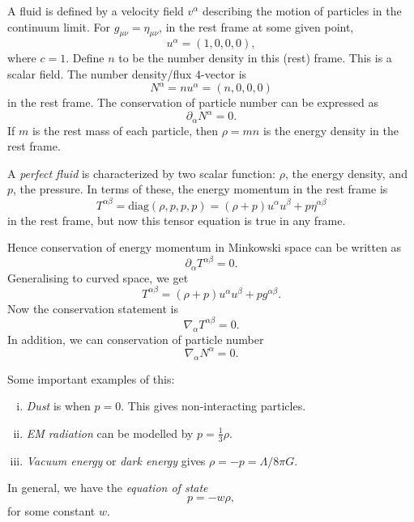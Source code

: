\documentclass[12pt]{article}
\begin{document}
\begin{exbox}
	A fluid is defined by a velocity field $v^\alpha$ describing the motion of particles in the continuum limit. For $g_{\mu\nu} = \eta_{\mu\nu}$, in the rest frame at some given point,
	\[
	u^\alpha = (1, 0, 0, 0),
	\]
	where $c = 1$. Define $n$ to be the number density in this (rest) frame. This is a scalar field. The number density/flux $4$-vector is
	\[
	N^\alpha = nu^\alpha = (n, 0, 0, 0)
	\]
	in the rest frame. The conservation of particle number can be expressed as
	\[
	\partial_\alpha N^\alpha = 0.
	\]
	If $m$ is the rest mass of each particle, then $\rho = mn$ is the energy density in the rest frame.

	A \emph{perfect fluid} is characterized by two scalar function: $\rho$, the energy density, and $p$, the pressure. In terms of these, the energy momentum in the rest frame is
	\[
	T^{\alpha\beta} = \mathrm{diag}(\rho, p, p, p) = (\rho + p)u^\alpha u^\beta + p \eta^{\alpha\beta}
	\]
	in the rest frame, but now this tensor equation is true in any frame.

	Hence conservation of energy momentum in Minkowski space can be written as
	\[
	\partial_\alpha T^{\alpha\beta} = 0.
	\]
	Generalising to curved space, we get
	\[
	T^{\alpha\beta} = (\rho + p)u^{\alpha} u^\beta + p g^{\alpha\beta}.
	\]
	Now the conservation statement is
	\[
	\nabla_\alpha T^{\alpha\beta} = 0.
	\]
	In addition, we can conservation of particle number
	\[
	\nabla_\alpha N^\alpha = 0.
	\]
\end{exbox}

Some important examples of this:
\begin{enumerate}[(i)]
	\item \emph{Dust} is when $p = 0$. This gives non-interacting particles.
	\item \emph{EM radiation} can be modelled by $p = \frac{1}{3} \rho$.
	\item \emph{Vacuum energy} or \emph{dark energy} gives $\rho = -p = \Lambda/8\pi G$.
\end{enumerate}
In general, we have the \emph{equation of state}
\[
p = - w\rho,
\]
for some constant $w$.
\end{document}
